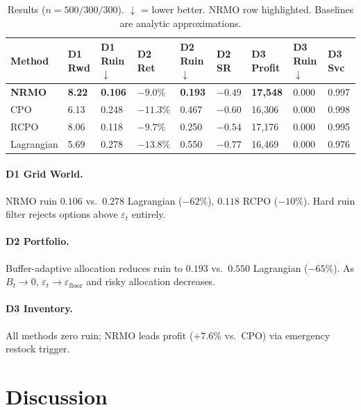 \begin{table}[ht]
\centering
\scriptsize
\begin{tabularx}{\linewidth}{lXXXXXXXX}
\toprule
\textbf{Method} & \textbf{D1 Rwd} & \textbf{D1 Ruin$\downarrow$}
& \textbf{D2 Ret} & \textbf{D2 Ruin$\downarrow$} & \textbf{D2 SR}
& \textbf{D3 Profit} & \textbf{D3 Ruin$\downarrow$}
& \textbf{D3 Svc} \\
\midrule
\textbf{NRMO} & \textbf{8.22} & \textbf{0.106} & $-9.0\%$
& \textbf{0.193} & $-0.49$ & \textbf{17{,}548} & 0.000 & 0.997 \\
CPO & 6.13 & 0.248 & $-11.3\%$ & 0.467 & $-0.60$ & 16{,}306 & 0.000
& 0.998 \\
RCPO & 8.06 & 0.118 & $-9.7\%$ & 0.250 & $-0.54$ & 17{,}176 & 0.000
& 0.995 \\
Lagrangian & 5.69 & 0.278 & $-13.8\%$ & 0.550 & $-0.77$
& 16{,}469 & 0.000 & 0.976 \\
\bottomrule
\end{tabularx}
\caption[Empirical results]{Results
($n = 500 / 300 / 300$). $\downarrow$ = lower better. NRMO row
highlighted. Baselines are analytic approximations.}
\label{tab:tf-v4-empirical}
\end{table}

\paragraph{D1 Grid World.}
NRMO ruin $0.106$ vs.~$0.278$ Lagrangian ($-62\%$),
$0.118$ RCPO ($-10\%$). Hard ruin filter rejects options above
$\varepsilon_t$ entirely.

\paragraph{D2 Portfolio.}
Buffer-adaptive allocation reduces ruin to $0.193$ vs.~$0.550$
Lagrangian ($-65\%$). As $B_t \to 0$, $\varepsilon_t \to
\varepsilon_{\mathrm{floor}}$ and risky allocation decreases.

\paragraph{D3 Inventory.}
All methods zero ruin; NRMO leads profit ($+7.6\%$ vs.~CPO) via
emergency restock trigger.

\section{Discussion}
\label{sec:tf-v4-discussion}

